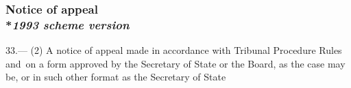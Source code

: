 \documentclass[12pt,a4paper]{article}
\begin{document}
\subsubsection[33. 
Notice of appeal --- \emph{1993 scheme version}%
]{%
Notice of appeal\\*\emph{1993 scheme version}%
}

33.—%
%
%
%
%
%
(2) 
A notice of appeal made in accordance with Tribunal Procedure Rules and~on a form approved by the Secretary of State
or the Board, as the case may be, or in such other format as the Secretary of State
\end{document}
